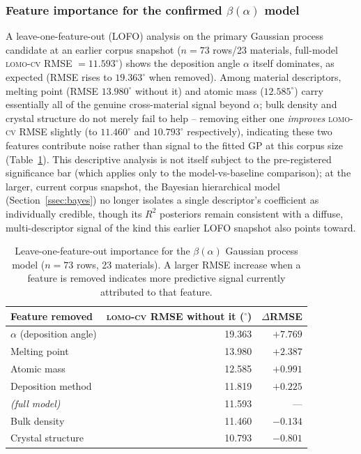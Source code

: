 \documentclass[aip,amsmath,amssymb,reprint]{revtex4-1}
\newcommand{\lomo}{\textsc{lomo-cv}}
\newcommand{\beto}{\ensuremath{\beta(\alpha)}}
\begin{document}
\subsubsection{Feature importance for the confirmed \beto{} model}
\label{sssec:lofo}

A leave-one-feature-out (LOFO) analysis on the primary Gaussian process
candidate at an earlier corpus snapshot ($n=73$ rows/23 materials,
full-model \lomo{} RMSE $=11.593^{\circ}$) shows the deposition angle
$\alpha$ itself dominates, as expected (RMSE rises to
$19.363^{\circ}$ when removed). Among material descriptors, melting
point (RMSE $13.980^{\circ}$ without it) and atomic mass
($12.585^{\circ}$) carry essentially all of the genuine cross-material
signal beyond $\alpha$; bulk density and crystal structure do not
merely fail to help -- removing either one \emph{improves} \lomo{}
RMSE slightly (to $11.460^{\circ}$ and $10.793^{\circ}$
respectively), indicating these two features contribute noise rather
than signal to the fitted GP at this corpus size
(Table~\ref{tab:lofo}). This descriptive analysis is not itself
subject to the pre-registered significance bar (which applies only to
the model-vs-baseline comparison); at the larger, current corpus
snapshot, the Bayesian hierarchical model (Section~\ref{ssec:bayes})
no longer isolates a single descriptor's coefficient as individually
credible, though its $R^2$ posteriors remain consistent with a
diffuse, multi-descriptor signal of the kind this earlier LOFO
snapshot also points toward.

\begin{table}[htbp]
  \centering
  \caption{Leave-one-feature-out importance for the \beto{} Gaussian
    process model ($n=73$ rows, 23 materials). A larger RMSE increase
    when a feature is removed indicates more predictive signal
    currently attributed to that feature.}
  \label{tab:lofo}
  \begin{tabular}{lrr}
    \toprule
    Feature removed & \lomo{} RMSE without it ($^\circ$) & $\Delta$RMSE \\
    \midrule
    $\alpha$ (deposition angle) & 19.363 & $+7.769$ \\
    Melting point & 13.980 & $+2.387$ \\
    Atomic mass & 12.585 & $+0.991$ \\
    Deposition method & 11.819 & $+0.225$ \\
    \emph{(full model)} & 11.593 & --- \\
    Bulk density & 11.460 & $-0.134$ \\
    Crystal structure & 10.793 & $-0.801$ \\
    \bottomrule
  \end{tabular}
\end{table}
\end{document}
